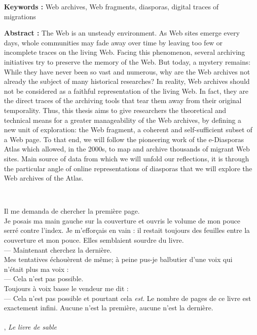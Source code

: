\documentclass[symmetric,justified,marginals=raggedouter]{tufte-book}
\begin{document}
\begin{fullwidth}
\noindent\textbf{Keywords :} Web archives, Web fragments, diasporas, digital traces of migrations 

\noindent\textbf{Abstract :} The Web is an unsteady environment. As Web sites emerge every days, whole communities may fade away over time by leaving too few or incomplete traces on the living Web. Facing this phenomenon, several archiving initiatives try to preserve the memory of the Web. But today, a mystery remains: While they have never been so vast and numerous, why are the Web archives not already the subject of many historical researches? In reality, Web archives should not be considered as a faithful representation of the living Web. In fact, they are the direct traces of the archiving tools that tear them away from their original temporality. Thus, this thesis aims to give researchers the theoretical and technical means for a greater manageability of the Web archives, by defining a new unit of exploration: the Web fragment, a coherent and self-sufficient subset of a Web page. To that end, we will follow the pioneering work of the e-Diasporas Atlas which allowed, in the 2000s, to map and archive thousands of migrant Web sites. Main source of data from which we will unfold our reflections, it is through the particular angle of online representations of diasporas that we will explore the Web archives of the Atlas.


\end{fullwidth}
  
\thispagestyle{empty}%
\clearpage%


\newpage

~\vfill
\noindent
\par\noindent \og Il me demanda de chercher la première page.\\
\noindent Je posais ma main gauche sur la couverture et ouvris le volume de mon pouce serré contre l'index. Je m'efforçais en vain : il restait toujours des feuilles entre la couverture et mon pouce. Elles semblaient sourdre du livre.\\
--- Maintenant cherchez la dernière.\\
\noindent Mes tentatives échouèrent de même; à peine pus-je balbutier d'une voix qui n'était plus ma voix :\\
--- Cela n'est pas possible.\\
\noindent Toujours à voix basse le vendeur me dit : \\
--- Cela n'est pas possible et pourtant cela \textit{est}. Le nombre de pages de ce livre est exactement infini. Aucune n'est la première, aucune n'est la dernière. \fg
\\~\\
\noindent {}, \textit{Le livre de sable} 
\vfill
\indent
\end{document}
